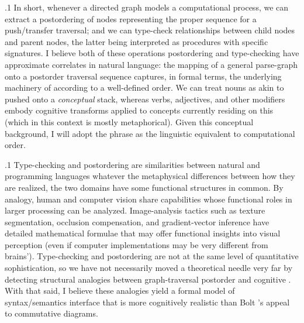 \documentclass[11pt, twocolumn]{article}
\begin{document}
\p.1{%
In short, whenever a directed graph models a computational
process, we can extract a postordering of nodes
representing the proper sequence for a push/transfer traversal;
and we can type-check relationships between
child nodes and parent nodes, the latter being interpreted
as procedures with specific signatures.  I believe
both of these operations \mdash{} postordering and type-checking
\mdash{} have approximate correlates in natural language:
the mapping of a general parse-graph onto
a postorder traversal sequence captures, in formal terms,
the underlying machinery of 
according to a well-defined order.
We can treat nouns as akin to
 pushed onto a \textit{conceptual} stack,
whereas verbs, adjectives, and other modifiers
embody cognitive transforms applied to concepts
currently residing on this 
(which in this context is mostly metaphorical).
Given this conceptual background, I will adopt the
phrase  as the linguistic
equivalent to computational  order.
} %

\p.1{%
Type-checking and postordering are 
similarities between natural and programming languages
\mdash{} whatever the metaphysical differences between how
they are realized, the two domains have some
functional structures in common.  By analogy,
human and computer vision share capabilities
whose functional roles in larger processing 
can be analyzed.  Image-analysis tactics such as texture
segmentation, occlusion compensation, and gradient-vector inference
have detailed mathematical formulae that may offer functional insights into
visual perception (even if computer implementations may
be very different from brains').  Type-checking and postordering are
not at the same level of quantitative sophistication,
so we have not necessarily moved a theoretical needle very far
by detecting structural analogies between graph-traversal
postorder and cognitive .  With that said,
I believe these analogies yield a formal model of
syntax/semantics interface that is more cognitively realistic
than Bolt \etal{}'s appeal to commutative diagrams.
} %
\end{document}
